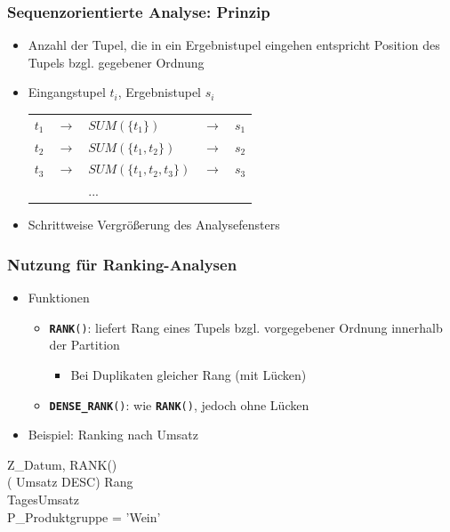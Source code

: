     \begin{frame}
    
      \frametitle{Sequenzorientierte Analyse: Prinzip}
    
    \begin{itemize}
    \item Anzahl der Tupel, die in ein Ergebnistupel eingehen entspricht
      Position des Tupels bzgl. gegebener Ordnung
    \item Eingangstupel $t_i$, Ergebnistupel $s_i$
      \begin{center}
        \begin{tabular}{cclcc}
          $t_1$&	$ \longrightarrow $	&$SUM(\{t_1\})$&	$ \longrightarrow $		&	$s_1$\\
          $t_2$	&	$ \longrightarrow $	&$SUM(\{t_1, t_2\})$	&	$ \longrightarrow $	&	$s_2$\\
          $t_3$&	$ \longrightarrow $	&	$SUM(\{t_1 ,t_2 ,t_3\})$&	$ \longrightarrow $	&	$s_3$\\
          &&...&&
        \end{tabular}
      \end{center}
    \item Schrittweise Vergrößerung des Analysefensters
    \end{itemize}
    
    \end{frame}
    
    
    
    
    \begin{frame}
    
    \frametitle{Nutzung für Ranking-Analysen}
    \begin{itemize}
    \item Funktionen
      \begin{itemize}
      \item \texttt{\textbf{RANK}()}: liefert Rang eines Tupels
        bzgl. vorgegebener Ordnung innerhalb der Partition
        \begin{itemize}
        \item Bei Duplikaten gleicher Rang (mit Lücken)
        \end{itemize}
      \item \texttt{\textbf{DENSE\_RANK}()}: wie \texttt{\textbf{RANK}()},
        jedoch ohne Lücken
      \end{itemize}
    \item Beispiel: Ranking nach Umsatz
    
    \end{itemize}
    \begin{sql}
     Z\_Datum, RANK() \\
    \1 ( Umsatz DESC)  Rang \\
      TagesUmsatz \\
      P\_Produktgruppe = 'Wein'
    \end{sql}
    
    \end{frame}
    
